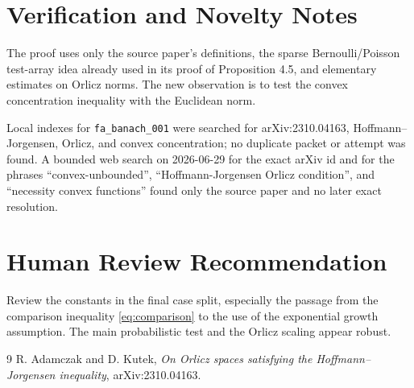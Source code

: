\documentclass[11pt]{amsart}
\theoremstyle{remark}
\begin{document}
\section*{Verification and Novelty Notes}

The proof uses only the source paper's definitions, the sparse Bernoulli/Poisson
test-array idea already used in its proof of Proposition 4.5, and elementary
estimates on Orlicz norms.  The new observation is to test the convex
concentration inequality with the Euclidean norm.

Local indexes for \texttt{fa\_banach\_001} were searched for arXiv:2310.04163,
Hoffmann--Jorgensen, Orlicz, and convex concentration; no duplicate packet or
attempt was found.  A bounded web search on 2026-06-29 for the exact arXiv id
and for the phrases ``convex-unbounded'', ``Hoffmann-Jorgensen Orlicz
condition'', and ``necessity convex functions'' found only the source paper and
no later exact resolution.

\section*{Human Review Recommendation}

Review the constants in the final case split, especially the passage from the
comparison inequality \eqref{eq:comparison} to the use of the exponential
growth assumption.  The main probabilistic test and the Orlicz scaling appear
robust.

\begin{thebibliography}{9}
R. Adamczak and D. Kutek,
\emph{On Orlicz spaces satisfying the Hoffmann--Jorgensen inequality},
arXiv:2310.04163.
\end{thebibliography}
\end{document}
